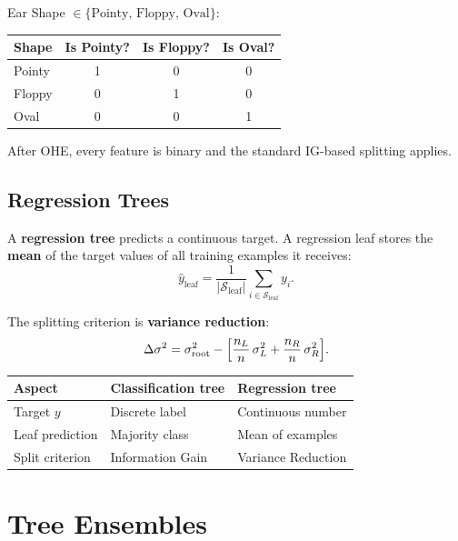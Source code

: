 \begin{example}
Ear Shape $\in\{\text{Pointy, Floppy, Oval}\}$:
\begin{center}
\begin{tabular}{lccc}
\toprule
Shape & Is Pointy? & Is Floppy? & Is Oval?\\
\midrule
Pointy & 1 & 0 & 0\\
Floppy & 0 & 1 & 0\\
Oval   & 0 & 0 & 1\\
\bottomrule
\end{tabular}
\end{center}
\end{example}

After OHE, every feature is binary and the standard IG-based splitting applies.

\subsection{Regression Trees}

A \textbf{regression tree} predicts a continuous target. A regression leaf
stores the \textbf{mean} of the target values of all training examples it
receives:
\[
\hat{y}_{\text{leaf}}=\frac{1}{|\mathcal{S}_{\text{leaf}}|}
\sum_{i\in\mathcal{S}_{\text{leaf}}}y_i.
\]

The splitting criterion is \textbf{variance reduction}:
\begin{equation}
\Delta\sigma^2=\sigma^2_{\text{root}}
-\Bigl[\frac{n_L}{n}\,\sigma^2_L+\frac{n_R}{n}\,\sigma^2_R\Bigr].
\label{eq:var-reduction}
\end{equation}

\begin{center}
\begin{tabular}{lll}
\toprule
\textbf{Aspect} & \textbf{Classification tree} & \textbf{Regression tree}\\
\midrule
Target $y$       & Discrete label   & Continuous number\\
Leaf prediction  & Majority class   & Mean of examples\\
Split criterion  & Information Gain & Variance Reduction\\
\bottomrule
\end{tabular}
\end{center}

\section{Tree Ensembles}

